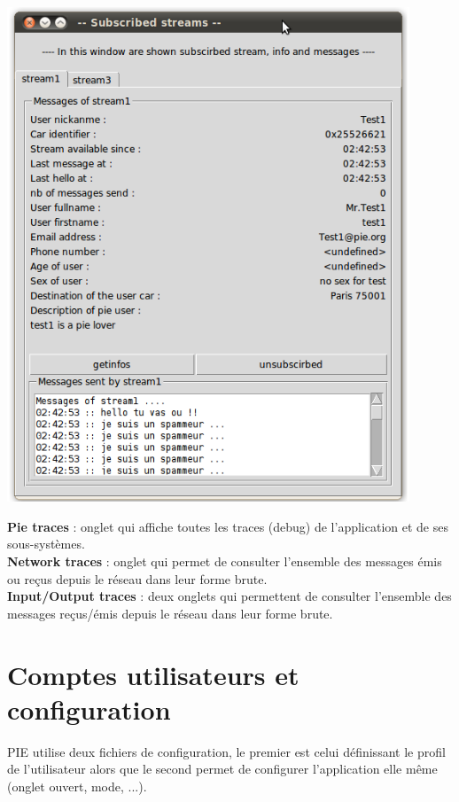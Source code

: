 \begin{center}
    \includegraphics[width=0.9\textwidth]{img/subscribed.png}
\end{center}

\textbf{Pie traces} : onglet qui affiche toutes les traces (debug) de l'application et de ses sous-systèmes.\\

\textbf{Network traces} : onglet qui permet de consulter l'ensemble des messages émis ou reçus depuis le réseau dans leur forme brute.\\

\textbf{Input/Output traces} : deux onglets qui permettent de consulter l'ensemble des messages reçus/émis depuis le réseau dans leur forme brute. \\

\section{Comptes utilisateurs et configuration}

PIE utilise deux fichiers de configuration, le premier est celui définissant le profil de l'utilisateur
alors que le second permet de configurer l'application elle même (onglet ouvert, mode, ...).  \\

